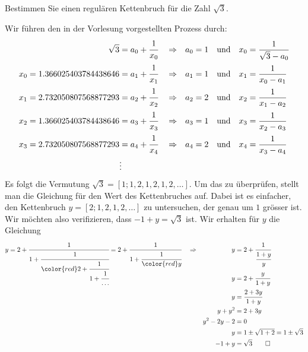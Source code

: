 Bestimmen Sie einen regulären Kettenbruch für die Zahl $\sqrt{3}$.

\begin{loesung}
Wir führen den in der Vorlesung vorgestellten Prozess durch:
\begin{align*}
\sqrt{3} &= a_0 + \cfrac{1}{x_0}
&&\Rightarrow &
a_0 &=1&&\text{und}&x_0&=\frac{1}{\sqrt{3}-a_0}
\\
x_0=1.366025403784438646&=a_1+\cfrac{1}{x_1}
&&\Rightarrow &
a_1 &=1&&\text{und}&x_1&=\frac{1}{x_0-a_1}
\\
x_1=2.732050807568877293&=a_2+\cfrac{1}{x_2}
&&\Rightarrow &
a_2 &=2&&\text{und}&x_2&=\frac{1}{x_1-a_2}
\\
x_2=1.366025403784438646&=a_3+\cfrac{1}{x_3}
&&\Rightarrow &
a_3 &=1&&\text{und}&x_3&=\frac{1}{x_2-a_3}
\\
x_3=2.732050807568877293&=a_4+\cfrac{1}{x_4}
&&\Rightarrow &
a_4 &=2&&\text{und}&x_4&=\frac{1}{x_3-a_4}
\\
&\vdots
\end{align*}
Es folgt die Vermutung $\sqrt{3} = [1;1,2,1,2,1,2,\dots]$.
Um das zu überprüfen, stellt man die Gleichung für den Wert des Kettenbruches
auf.
Dabei ist es einfacher, den Kettenbruch $y=[2;1,2,1,2,\dots]$ zu untersuchen,
der genau um $1$ grösser ist.
Wir möchten also verifizieren, dass $-1+y = \sqrt{3}$ ist.
Wir erhalten für $y$ die Gleichung 
\begin{align*}
y
&=
2 + \smash{\cfrac{1}{1+\cfrac{1}{{\color{red}2+\cfrac{1}{1+\cfrac{1}{\dots}}}}}}
=
2 + \cfrac{1}{1+\cfrac{1}{{\color{red}y}}}
&&\Rightarrow& y &=2+\cfrac{1}{\cfrac{1+y}{y}}
\\
&&&&
y&=2+\cfrac{y}{1+y}
\\
&&&&
y&=\cfrac{2+3y}{1+y}
\\
&&&&
y+y^2&=2+3y
\\
&&&&
y^2-2y-2&=0
\\
&&&&
y&=1\pm\sqrt{1+2}=1\pm\sqrt{3}
\\
&&&&
-1+y&=\sqrt{3}
\qedhere
\end{align*}
\end{loesung}
